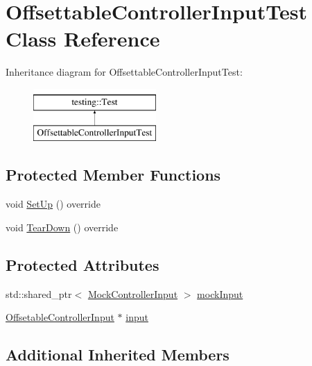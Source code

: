 \hypertarget{classOffsettableControllerInputTest}{}\section{Offsettable\+Controller\+Input\+Test Class Reference}
\label{classOffsettableControllerInputTest}
Inheritance diagram for Offsettable\+Controller\+Input\+Test\+:\begin{figure}[H]
\begin{center}
\leavevmode
\includegraphics[height=2.000000cm]{classOffsettableControllerInputTest}
\end{center}
\end{figure}
\subsection*{Protected Member Functions}
\begin{DoxyCompactItemize}
\item 
void \mbox{\hyperlink{classOffsettableControllerInputTest_aaec2724fa975e4388bb1f416f9856ac7}{Set\+Up}} () override
\item 
void \mbox{\hyperlink{classOffsettableControllerInputTest_a7ceb6fad89b8f9bd02c11eda7d19f6a7}{Tear\+Down}} () override
\end{DoxyCompactItemize}
\subsection*{Protected Attributes}
\begin{DoxyCompactItemize}
\item 
std\+::shared\+\_\+ptr$<$ \mbox{\hyperlink{classokapi_1_1MockControllerInput}{Mock\+Controller\+Input}} $>$ \mbox{\hyperlink{classOffsettableControllerInputTest_a1e0171ecf521e79cc7d5bf78b5752991}{mock\+Input}}
\item 
\mbox{\hyperlink{classokapi_1_1OffsetableControllerInput}{Offsetable\+Controller\+Input}} $\ast$ \mbox{\hyperlink{classOffsettableControllerInputTest_a8a7db5ad4b93180a4076e6e6306b9999}{input}}
\end{DoxyCompactItemize}
\subsection*{Additional Inherited Members}


